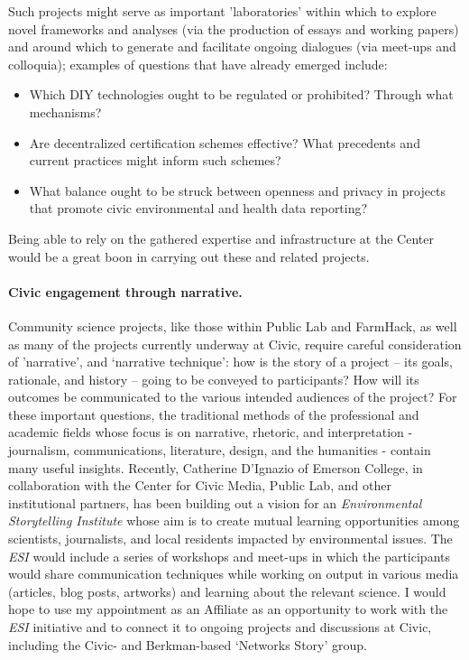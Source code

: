 \documentclass[10pt]{article}
\begin{document}
Such projects might serve as important 'laboratories' within which to explore novel frameworks and analyses (via the production of essays and working papers) and around which to generate and facilitate ongoing dialogues (via meet-ups and colloquia); examples of questions that have already emerged include: 

\begin{itemize}
\item Which DIY technologies ought to be regulated or prohibited? Through what mechanisms?
\item Are decentralized certification schemes effective? What precedents and current practices might inform such schemes?
\item What balance ought to be struck between openness and privacy in projects that promote civic environmental and health data reporting? 
\end{itemize}

Being able to rely on the gathered expertise and infrastructure at the Center would be a great boon in carrying out these and related projects. 


\paragraph{Civic engagement through narrative.} Community science projects, like those within Public Lab and FarmHack, as well as many of the projects currently underway at Civic, require careful consideration of 'narrative', and `narrative technique':  how is the story of a project -- its goals, rationale, and history -- going to be conveyed to participants? How will its outcomes be communicated to the various intended audiences of the project? For these important questions, the traditional methods of the professional and academic fields whose focus is on narrative, rhetoric, and interpretation - journalism, communications, literature, design, and the humanities - contain many useful insights.  Recently, Catherine D'Ignazio of Emerson College, in collaboration with the Center for Civic Media, Public Lab, and other institutional partners, has been building out a vision for an \emph{Environmental Storytelling Institute} whose aim is to create mutual learning opportunities among scientists, journalists, and local residents impacted by environmental issues.  The \emph{ESI} would include a series of workshops and meet-ups in which the participants would share communication techniques while working on output in various media (articles, blog posts, artworks) and learning about the relevant science.  I would hope to use my appointment as an Affiliate as an opportunity to work with the \emph{ESI} initiative and to connect it to ongoing projects and discussions at Civic, including the Civic- and Berkman-based `Networks Story' group.
\end{document}
